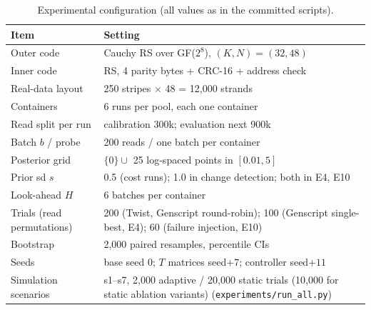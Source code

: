 \begin{table}[!t]
\centering
\caption{Experimental configuration (all values as in the committed scripts).}
\label{tab:config}
\scriptsize
\begin{tabular}{@{}p{30mm}p{48mm}@{}}
\toprule
Item & Setting \\
\midrule
Outer code & Cauchy RS over GF($2^8$), $(K,N)=(32,48)$ \\
Inner code & RS, 4 parity bytes + CRC-16 + address check \\
Real-data layout & 250 stripes $\times$ 48 = 12{,}000 strands \\
Containers & 6 runs per pool, each one container \\
Read split per run & calibration 300k; evaluation next 900k \\
Batch $b$ / probe & 200 reads / one batch per container \\
Posterior grid & $\{0\}\cup$ 25 log-spaced points in $[0.01,5]$ \\
Prior sd $s$ & 0.5 (cost runs); 1.0 in change detection; both in E4, E10 \\
Look-ahead $H$ & 6 batches per container \\
Trials (read permutations) & 200 (Twist, Genscript round-robin); 100 (Genscript single-best, E4); 60 (failure injection, E10) \\
Bootstrap & 2{,}000 paired resamples, percentile CIs \\
Seeds & base seed 0; $T$ matrices seed$+7$; controller seed$+11$ \\
Simulation scenarios & s1--s7, 2{,}000 adaptive / 20{,}000 static trials (10{,}000 for static ablation variants) (\texttt{experiments/run\_all.py}) \\
\bottomrule
\end{tabular}
\end{table}
